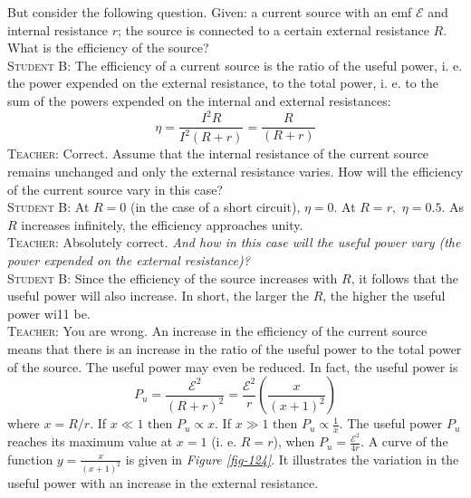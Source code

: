 \documentclass[a4paper,sfsidenotes]{tufte-book}
\newcommand{\Ea}{\mathcal{E}}
\begin{document}
But consider the following question. Given: a current source with an emf $\Ea$ and internal resistance $r$; the source is connected to a certain external resistance $R$. What is the efficiency of the source?
\\
\textsc{Student B:} The efficiency of a current source is the ratio of the useful power, i. e. the power expended on the external resistance, to the total power, i. e. to the sum of the powers expended on the internal and external resistances:
\begin{equation}%
\eta = \frac{I^{2}R}{I^{2}(R+r)} = \frac{R}{(R+r)}
\label{eq-185}
\end{equation}
\textsc{Teacher:} Correct. Assume that the internal resistance of the current source remains unchanged and only the external resistance varies. How will the efficiency of the current source vary in this case?
\\
\textsc{Student B:} At $R=0$ (in the case of a short circuit), $\eta=0$. At $R=r, \,\, \eta=0.5$. As $R$ increases infinitely, the efficiency approaches unity.
\\
\textsc{Teacher:} Absolutely correct. \emph{And how in this case will the useful power vary (the power expended on the external resistance)?}
\\
\textsc{Student B:} Since the efficiency of the source increases with $R$, it follows that the useful power will also increase. In short, the larger the $R$, the higher the useful power wi11 be.
\\
\textsc{Teacher:} You are wrong. An increase in the efficiency of the current source means that there is an increase in the ratio of the useful power to the total power of the source. The useful power may even be reduced. In fact, the useful power is
\begin{equation}%
P_{u} = \frac{\Ea^{2}}{(R+r)^{2}} = \frac{\Ea^{2}}{r} \left( \frac{x}{(x+1)^{2}} \right)
\label{eq-186}
\end{equation}
where $x=R/r$. If $ x\ll 1 \,\, \text{then} \,\, P_{u}  \propto x $. If $ x\gg 1 \,\, \text{then} \,\, P_{u} \propto \frac{1}{x} $. The useful power $P_{u}$ reaches its maximum value at $x= 1$ (i. e. $R=r$), when $P_{u} = \frac{\Ea^{2}}{4r}$. A curve of the function $y=\frac{x}{(x+ 1)^{2}}$ is given in \emph{Figure \ref{fig-124}}. It illustrates the variation in the useful power with an increase in the external resistance. 
\end{document}

